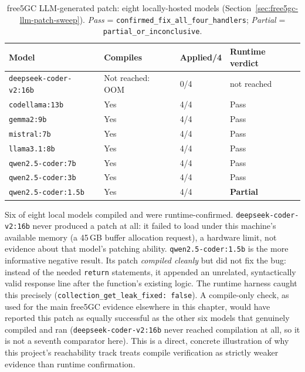 \documentclass[12pt,a4paper]{report}
\begin{document}
\begin{table}[H]
\centering
\caption{free5GC LLM-generated patch: eight locally-hosted models (Section~\ref{sec:free5gc-llm-patch-sweep}). \textit{Pass} = \texttt{confirmed\_fix\_all\_four\_handlers}; \textit{Partial} = \texttt{partial\_or\_inconclusive}.}
\small
\begin{tabular}{@{}p{3.6cm}p{3.4cm}p{1.4cm}p{2.8cm}@{}}
\toprule
\textbf{Model} & \textbf{Compiles} & \textbf{Applied/4} & \textbf{Runtime verdict} \\
\midrule
\texttt{deepseek-coder-v2:16b} & Not reached: OOM & 0/4 & not reached \\
\texttt{codellama:13b} & Yes & 4/4 & Pass \\
\texttt{gemma2:9b} & Yes & 4/4 & Pass \\
\texttt{mistral:7b} & Yes & 4/4 & Pass \\
\texttt{llama3.1:8b} & Yes & 4/4 & Pass \\
\texttt{qwen2.5-coder:7b} & Yes & 4/4 & Pass \\
\texttt{qwen2.5-coder:3b} & Yes & 4/4 & Pass \\
\texttt{qwen2.5-coder:1.5b} & Yes & 4/4 & \textbf{Partial} \\
\bottomrule
\end{tabular}
\end{table}

Six of eight local models compiled and were runtime-confirmed. \texttt{deepseek-coder-v2:16b} never produced a patch at all: it failed to load under this machine's available memory (a 45\,GB buffer allocation request), a hardware limit, not evidence about that model's patching ability. \texttt{qwen2.5-coder:1.5b} is the more informative negative result. Its patch \emph{compiled cleanly} but did not fix the bug: instead of the needed \texttt{return} statements, it appended an unrelated, syntactically valid response line after the function's existing logic. The runtime harness caught this precisely (\texttt{collection\_get\_leak\_fixed: false}). A compile-only check, as used for the main free5GC evidence elsewhere in this chapter, would have reported this patch as equally successful as the other six models that genuinely compiled and ran (\texttt{deepseek-coder-v2:16b} never reached compilation at all, so it is not a seventh comparator here). This is a direct, concrete illustration of why this project's reachability track treats compile verification as strictly weaker evidence than runtime confirmation.
\end{document}
